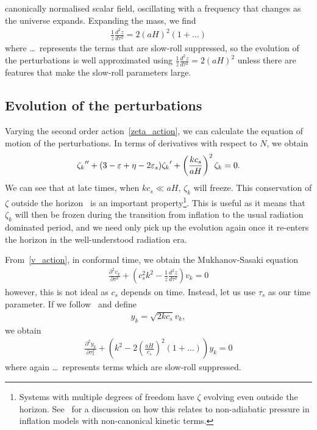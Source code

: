     canonically normalised scalar field, oscillating
    with a frequency that changes as the universe expands.
    Expanding the mass, we find
    \begin{align}
        \frac{1}{z}\frac{d^2z}{d\tau^2} = 2{\left(aH\right)}^2\left(1+\ldots\right)
    \end{align}
    where \ldots~represents the terms that are slow-roll suppressed,
    so the evolution of the perturbations is well approximated using
    $\frac{1}{z}\frac{d^2z}{d\tau^2} = 2{\left(aH\right)}^2$
    unless there are features that make the slow-roll parameters large.

    \subsection{Evolution of the perturbations}\label{pert_evol}
    Varying the second order action~\eqref{zeta_action}, we can calculate the equation of motion
    of the perturbations.
    In terms of derivatives with respect to $N$, we obtain
    \begin{align}\label{modefneqn_zeta_N}
        {\zeta_k}'' + (3-\varepsilon+\eta-2\varepsilon_{s}){\zeta_k}'+\left(\frac{kc_s}{aH}\right)^2\zeta_k=0.
    \end{align}
    We can see that at late times, when $kc_s\ll aH$, $\zeta_k$ will freeze.
    This conservation of $\zeta$ outside the horizon~\cite{Lyth_conserved} is an
    important property\footnote{
    Systems with multiple degrees of freedom have $\zeta$ evolving even outside
    the horizon. See~\cite{Christopherson_2009} for a discussion on how this relates
    to non-adiabatic pressure in inflation models with non-canonical kinetic terms.}.
    This is useful as it means that $\zeta_k$ will then be frozen during the transition from inflation to the
    usual radiation dominated period, and we need only pick up the evolution again once it
    re-enters the horizon in the well-understood radiation era.


    From~\eqref{v_action}, in conformal time, we obtain the Mukhanov-Sasaki equation
    \begin{align}\label{modefneqn_tau}
        \frac{\partial^2 v_k}{\partial \tau^2} + \left(c_s^2k^2 - \frac{1}{z}\frac{d^2 z}{d \tau^2}\right)v_k = 0
    \end{align}
    however, this is not ideal as $c_s$ depends on time.
    Instead, let us use $\tau_s$ as our time parameter.
    If we follow~\cite{Hu_2011} and define
    \begin{align}
        y_k=\sqrt{2kc_s}v_k,
    \end{align}
    we obtain
    \begin{align}\label{modefneqn_tau_s}
        \frac{\partial^2 y_k}{\partial \tau_s^2} + \left(k^2 - 2\left(\frac{aH}{c_s}\right)^2(1+\ldots)\right)y_k = 0
    \end{align}
    where again \ldots~represents terms which are slow-roll suppressed.


